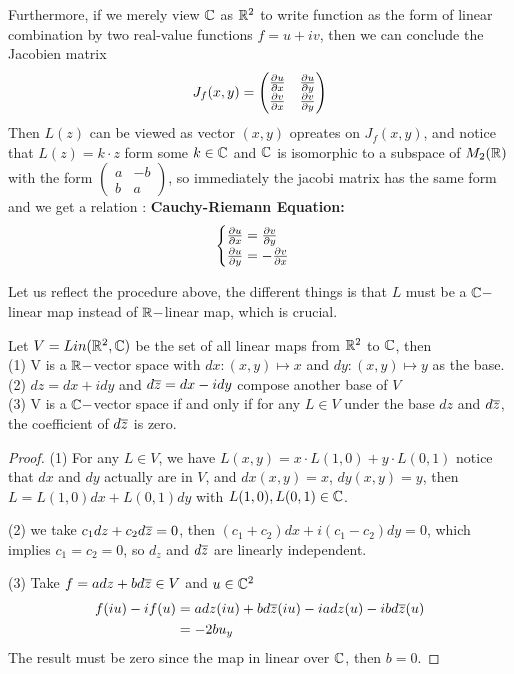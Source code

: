 \documentclass[en,geye,blue,normal,12pt,bibend=bibtex]{elegantnote}
\begin{document}
Furthermore, if we merely view \(\mathbb{C}\) as \(\mathbb{R}^2\) to write function as the form of linear combination by two real-value functions \(f=u+iv\), then we can conclude the Jacobien matrix 
\[J_f(x,y) = \begin{pmatrix}
    \frac{\partial u}{\partial x} & \frac{\partial u}{\partial y} \\
    \frac{\partial v}{\partial x} & \frac{\partial v}{\partial y}
\end{pmatrix}\]
Then \(L(z)\) can be viewed as vector \((x,y)\) opreates on \(J_f(x,y)\), and notice that \(L(z) = k\cdot z\) form some \(k \in \mathbb{C}\) and \(\mathbb{C}\) is isomorphic to a subspace of \(M_2(\mathbb{R})\) with the form \(\begin{pmatrix}
    a &-b\\
    b &a
\end{pmatrix}\), so immediately the jacobi matrix has the same form and we get a relation : \textbf{Cauchy-Riemann Equation:}
\[\begin{cases}
    \frac{\partial u}{\partial x} = \frac{\partial v}{\partial y} \\
    \frac{\partial u}{\partial y} = - \frac{\partial v}{\partial x}
\end{cases}\]

Let us reflect the procedure above, the different things is that \(L\) must be a \(\mathbb{C}-\)linear map instead of \(\mathbb{R}-\)linear map, which is crucial.

\begin{lemma}
    Let \(V = Lin(\mathbb{R}^2,\mathbb{C})\) be the set of all linear maps from \(\mathbb{R}^2\) to \(\mathbb{C}\), then
    \\(1) V is a \(\mathbb{R}-\)vector space with \(dx:(x,y) \mapsto x\) and \(dy: (x,y ) \mapsto y\) as the base.
    \\(2) \(dz=dx+idy\) and \(d\overline{z} = dx-idy\) compose another base of \(V\)
    \\(3) V is a \(\mathbb{C}-\)vector space if and only if for any \(L \in V\) under the base \(dz\) and \(d\overline{z}\), the coefficient of \(d \overline{z}\) is zero.

    \begin{proof}
        (1) For any \(L \in V\), we have \(L(x,y) = x\cdot L(1,0)+y \cdot L(0,1)\)
        notice that \(dx\) and \(dy\) actually are in \(V\), and \(dx(x,y)=x\), \(dy(x,y) = y\), then \(L=L(1,0)dx + L(0,1)dy\) with \(L(1,0), L(0,1) \in \mathbb{C}\).

        (2) we take \(c_1dz+c_2d\overline{z} =0\), then \((c_1+c_2)dx+i(c_1-c_2)dy=0\), which implies \(c_1 = c_2 =0\), so \(d_z\) and \(d\overline{z}\) are linearly independent.

        (3) Take \(f = adz+bd\overline{z} \in V\) and \(u \in \mathbb{C}^2\) 
        \begin{align*}
            f(iu)-if(u) &= adz(iu)+bd\overline{z}(iu)-iadz(u)-ibd\overline{z}(u) \\
            &= -2bu_y
        \end{align*} The result must be zero since the map in linear over \(\mathbb{C}\), then \(b = 0\).
    \end{proof}
\end{lemma}
\end{document}
